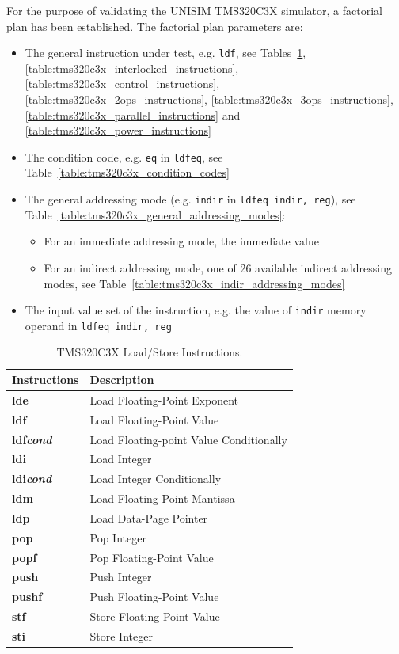 For the purpose of validating the UNISIM TMS320C3X simulator, a factorial plan has been established. 
The factorial plan parameters are:
\begin{itemize}
\item The general instruction under test, e.g. \texttt{ldf}, see Tables~\ref{table:tms320c3x_load_store_instructions}, \ref{table:tms320c3x_interlocked_instructions},  \ref{table:tms320c3x_control_instructions}, \ref{table:tms320c3x_2ops_instructions}, \ref{table:tms320c3x_3ops_instructions}, \ref{table:tms320c3x_parallel_instructions} and \ref{table:tms320c3x_power_instructions}
\item The condition code, e.g. \texttt{eq} in \texttt{ldfeq}, see Table~\ref{table:tms320c3x_condition_codes}
\item The general addressing mode (e.g. \texttt{indir} in \texttt{ldfeq indir, reg}), see Table~\ref{table:tms320c3x_general_addressing_modes}:
	\begin{itemize}
		\item For an immediate addressing mode, the immediate value
		\item For an indirect addressing mode, one of 26 available indirect addressing modes, see Table~\ref{table:tms320c3x_indir_addressing_modes}
	\end{itemize}
\item The input value set of the instruction, e.g. the value of \texttt{indir} memory operand in \texttt{ldfeq indir, reg}
\end{itemize}

\begin{table}[!p]
\begin{center}
	\small
	\begin{tabular}{|p{3.0cm}|p{10.0cm}|}
	\hline
	\textbf{Instructions} & \textbf{Description}\\
	\hline
	\textbf{lde} & Load Floating-Point Exponent\\
	\hline
	\textbf{ldf} & Load Floating-Point Value\\
	\hline
	\textbf{ldf\textit{cond}} & Load Floating-point Value Conditionally\\
	\hline
	\textbf{ldi} & Load Integer\\
	\hline
	\textbf{ldi\textit{cond}} & Load Integer Conditionally\\
	\hline
	\textbf{ldm} & Load Floating-Point Mantissa\\
	\hline
	\textbf{ldp} & Load Data-Page Pointer\\
	\hline
	\textbf{pop} & Pop Integer\\
	\hline
	\textbf{popf} & Pop Floating-Point Value\\
	\hline
	\textbf{push} & Push Integer\\
	\hline
	\textbf{pushf} & Push Floating-Point Value\\
	\hline
	\textbf{stf} & Store Floating-Point Value\\
	\hline
	\textbf{sti} & Store Integer\\
	\hline
	\end{tabular}
	\caption{\label{table:tms320c3x_load_store_instructions} TMS320C3X Load/Store Instructions.}
\end{center}
\end{table}

